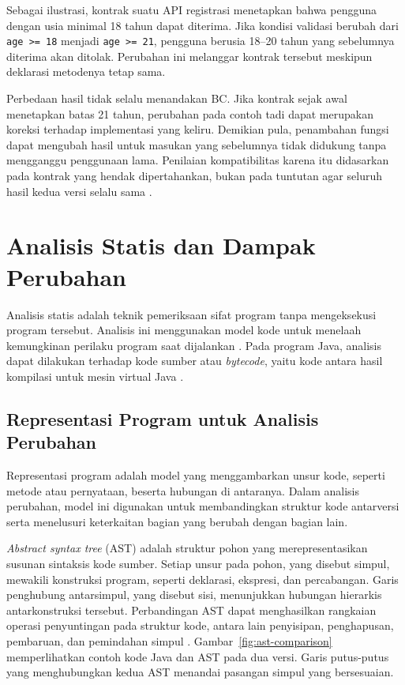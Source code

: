 Sebagai ilustrasi, kontrak suatu API registrasi menetapkan bahwa pengguna dengan usia minimal 18 tahun dapat diterima. Jika kondisi validasi berubah dari \texttt{age >= 18} menjadi \texttt{age >= 21}, pengguna berusia 18--20 tahun yang sebelumnya diterima akan ditolak. Perubahan ini melanggar kontrak tersebut meskipun deklarasi metodenya tetap sama.

Perbedaan hasil tidak selalu menandakan BC\@. Jika kontrak sejak awal menetapkan batas 21 tahun, perubahan pada contoh tadi dapat merupakan koreksi terhadap implementasi yang keliru. Demikian pula, penambahan fungsi dapat mengubah hasil untuk masukan yang sebelumnya tidak didukung tanpa mengganggu penggunaan lama. Penilaian kompatibilitas karena itu didasarkan pada kontrak yang hendak dipertahankan, bukan pada tuntutan agar seluruh hasil kedua versi selalu sama \parencite{Ochoa2023}.

\section{Analisis Statis dan Dampak Perubahan}
\label{sec:analisis-statis}

Analisis statis adalah teknik pemeriksaan sifat program tanpa mengeksekusi program tersebut. Analisis ini menggunakan model kode untuk menelaah kemungkinan perilaku program saat dijalankan \parencite{Nielson1999}. Pada program Java, analisis dapat dilakukan terhadap kode sumber atau \textit{bytecode}, yaitu kode antara hasil kompilasi untuk mesin virtual Java \parencite{JLS25Chapter13}.

\subsection{Representasi Program untuk Analisis Perubahan}

Representasi program adalah model yang menggambarkan unsur kode, seperti metode atau pernyataan, beserta hubungan di antaranya. Dalam analisis perubahan, model ini digunakan untuk membandingkan struktur kode antarversi serta menelusuri keterkaitan bagian yang berubah dengan bagian lain.

\textit{Abstract syntax tree} (AST) adalah struktur pohon yang merepresentasikan susunan sintaksis kode sumber. Setiap unsur pada pohon, yang disebut simpul, mewakili konstruksi program, seperti deklarasi, ekspresi, dan percabangan. Garis penghubung antarsimpul, yang disebut sisi, menunjukkan hubungan hierarkis antarkonstruksi tersebut. Perbandingan AST dapat menghasilkan rangkaian operasi penyuntingan pada struktur kode, antara lain penyisipan, penghapusan, pembaruan, dan pemindahan simpul \parencite{Falleri2014}. Gambar~\ref{fig:ast-comparison} memperlihatkan contoh kode Java dan AST pada dua versi. Garis putus-putus yang menghubungkan kedua AST menandai pasangan simpul yang bersesuaian.


